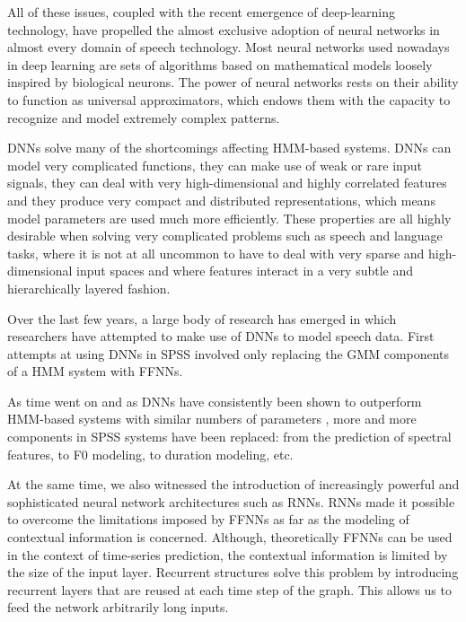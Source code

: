 All of these issues, coupled with the recent emergence of deep-learning technology, have propelled the almost exclusive adoption of neural networks in almost every domain of speech technology.
Most neural networks used nowadays in deep learning are sets of algorithms based on mathematical models loosely inspired by biological neurons.
The power of neural networks rests on their ability to function as universal approximators, which endows them with the capacity to recognize and model extremely complex patterns.

\acp{DNN} solve many of the shortcomings affecting \ac{HMM}-based systems.
\acp{DNN} can model very complicated functions, they can make use of weak or rare input signals, they can deal with very high-dimensional and highly correlated features and they produce very compact and distributed representations, which means model parameters are used much more efficiently.
These properties are all highly desirable when solving very complicated problems such as speech and language tasks, where it is not at all uncommon to have to deal with very sparse and high-dimensional input spaces and where features interact in a very subtle and hierarchically layered fashion.

Over the last few years, a large body of research has emerged in which researchers have attempted to make use of \acp{DNN} to model speech data. 
First attempts at using \acp{DNN} in \ac{SPSS} involved only replacing the \ac{GMM} components of a \ac{HMM} system \citep{Ling2013Modeling} with \acp{FFNN}.

As time went on and as \acp{DNN} have consistently been shown to outperform \ac{HMM}-based systems with similar numbers of parameters \citep{Zen2013Statistical}, more and more components in \ac{SPSS} systems have been replaced: from the prediction of spectral features, to \ac{F0} modeling, to duration modeling, etc.

At the same time, we also witnessed the introduction of increasingly powerful and sophisticated neural network architectures such as \acp{RNN}. \acp{RNN} made it possible to overcome the limitations imposed by \acp{FFNN} as far as the modeling of contextual information is concerned.
Although, theoretically \acp{FFNN} can be used in the context of time-series prediction, the contextual information is limited by the size of the input layer.
Recurrent structures solve this problem by introducing recurrent layers that are reused at each time step of the graph.
This allows us to feed the network arbitrarily long inputs.

